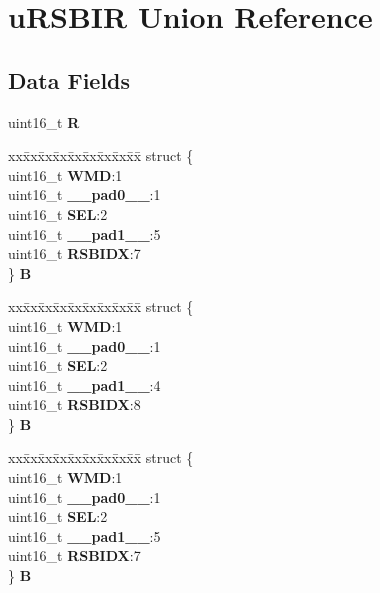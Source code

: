 \hypertarget{unionuRSBIR}{}\section{u\+R\+S\+B\+IR Union Reference}
\label{unionuRSBIR}
\subsection*{Data Fields}
\begin{DoxyCompactItemize}
\item 
\mbox{\label{unionuRSBIR_ae75c33a266bd7babe1fdb12d83a5703f}} 
uint16\+\_\+t {\bfseries R}
\item 
\mbox{\label{unionuRSBIR_a06a9e2426cd90fa7f34bb20090c26ec6}} 
\begin{tabbing}
xx\=xx\=xx\=xx\=xx\=xx\=xx\=xx\=xx\=\kill
struct \{\\
\>uint16\_t {\bfseries WMD}:1\\
\>uint16\_t {\bfseries \_\_pad0\_\_}:1\\
\>uint16\_t {\bfseries SEL}:2\\
\>uint16\_t {\bfseries \_\_pad1\_\_}:5\\
\>uint16\_t {\bfseries RSBIDX}:7\\
\} {\bfseries B}\\

\end{tabbing}\item 
\mbox{\label{unionuRSBIR_a6341a8332a8583e122d09988fe19c66e}} 
\begin{tabbing}
xx\=xx\=xx\=xx\=xx\=xx\=xx\=xx\=xx\=\kill
struct \{\\
\>uint16\_t {\bfseries WMD}:1\\
\>uint16\_t {\bfseries \_\_pad0\_\_}:1\\
\>uint16\_t {\bfseries SEL}:2\\
\>uint16\_t {\bfseries \_\_pad1\_\_}:4\\
\>uint16\_t {\bfseries RSBIDX}:8\\
\} {\bfseries B}\\

\end{tabbing}\item 
\mbox{\label{unionuRSBIR_ace342f4d625c42c80a61f13ed7862778}} 
\begin{tabbing}
xx\=xx\=xx\=xx\=xx\=xx\=xx\=xx\=xx\=\kill
struct \{\\
\>uint16\_t {\bfseries WMD}:1\\
\>uint16\_t {\bfseries \_\_pad0\_\_}:1\\
\>uint16\_t {\bfseries SEL}:2\\
\>uint16\_t {\bfseries \_\_pad1\_\_}:5\\
\>uint16\_t {\bfseries RSBIDX}:7\\
\} {\bfseries B}\\


\end{tabbing}
\end{DoxyCompactItemize}

